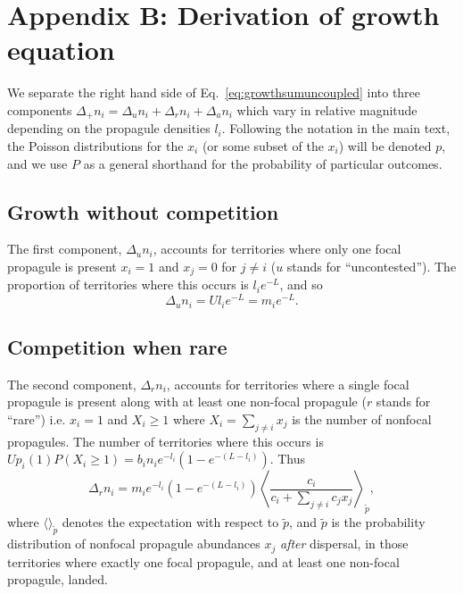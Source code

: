 \documentclass[11pt]{article}
\begin{document}
\section*{Appendix B: Derivation of growth equation}

We separate the right hand side of Eq.~\eqref{eq:growthsumuncoupled} into three components $\Delta_+ n_i = \Delta_u n_i+\Delta_r n_i+\Delta_a n_i$ which vary in relative magnitude depending on the propagule densities $l_i$. Following the notation in the main text, the Poisson distributions for the $x_i$ (or some subset of the $x_i$) will be denoted $p$, and we use $P$ as a general shorthand for the probability of particular outcomes.

\subsection*{Growth without competition}

The first component, $\Delta_u n_i$, accounts for territories where only one focal propagule is present $x_i=1$ and $x_j=0$ for $j\neq i$ ($u$ stands for ``uncontested''). The proportion of territories where this occurs is $l_i e^{-L}$, and so 
\begin{equation}
\Delta_u n_i=Ul_i e^{-L}=m_i e^{-L}.
\end{equation}

\subsection*{Competition when rare}

The second component, $\Delta_r n_i$, accounts for territories where a single focal propagule is present along with at least one non-focal propagule ($r$ stands for ``rare'') i.e. $x_i=1$ and $X_i\geq 1$ where $X_i=\sum_{j\neq i} x_j$ is the number of nonfocal propagules. The number of territories where this occurs is $Up_i(1)P(X_i\geq 1)=b_i n_i e^{-l_i}(1-e^{-(L-l_i)})$. Thus 
\begin{equation}
\Delta_r n_i = m_i e^{-l_i}(1-e^{-(L-l_i)})\left\langle  \frac{c_i}{c_i +\sum_{j\neq i} c_j x_j } \right\rangle_{\tilde{p}},  \label{eq:deltr}
\end{equation}
where $\langle \rangle_{\tilde{p}}$ denotes the expectation with respect to $\tilde{p}$, and $\tilde{p}$ is the probability distribution of nonfocal propagule abundances $x_j$ \textit{after} dispersal, in those territories where exactly one focal propagule, and at least one non-focal propagule, landed. 
\end{document}
